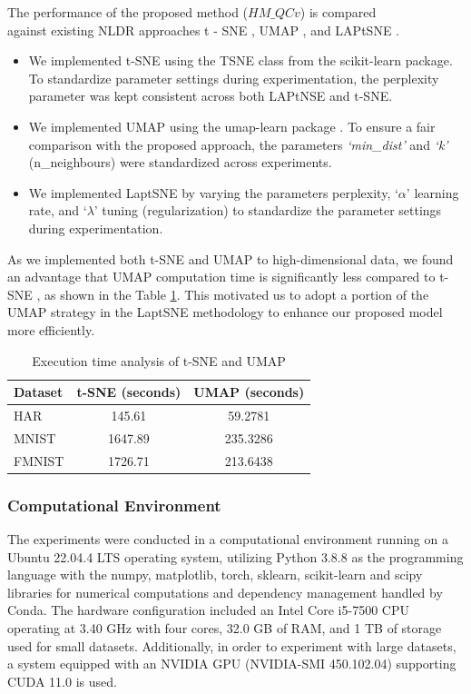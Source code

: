 The performance of the proposed method ($HM\_QCv$) is compared \\against existing NLDR approaches t - SNE \cite{tsne}, UMAP \cite{umap_reference}, and LAPtSNE \cite{sun2023laplacian}.

\begin{itemize}
    \item We implemented t-SNE \cite{tsne} using the TSNE class from the scikit-learn package. To standardize parameter settings during experimentation, the perplexity parameter was kept consistent across both LAPtNSE and t-SNE.
    \item We implemented UMAP \cite{umap_reference} using the umap-learn package \cite{umap-learn}. To ensure a fair comparison with the proposed approach, the parameters \textit{`min\_dist'} and \textit{`k'} (n\_neighbours) were standardized across experiments. 
    \item We implemented LaptSNE \cite{sun2023laplacian} by varying the parameters perplexity, `$\alpha$' learning rate, and `$\lambda$' tuning (regularization) to standardize the parameter settings during experimentation.
\end{itemize}
As we implemented both t-SNE \cite{tsne} and UMAP \cite{umap_reference} to high-dimensional data, we found an advantage that UMAP \cite{umap_reference} computation time is significantly less compared to t-SNE \cite{tsne}, as shown in the Table \ref{tsneumapcmp}. This motivated us to adopt a portion of the UMAP \cite{umap_reference} strategy in the LaptSNE \cite{sun2023laplacian} methodology to enhance our proposed model more efficiently.
\begin{table}[!htbp]
    \centering
    \caption{Execution time analysis of t-SNE and UMAP}
    \begin{tabular}{@{}lcc@{}}
        \toprule
        \textbf{Dataset} & \textbf{t-SNE \cite{tsne} (seconds)} & \textbf{UMAP \cite{umap_reference} (seconds)} \\ \midrule
        HAR    & 145.61    & 59.2781  \\
        MNIST  & 1647.89   & 235.3286 \\
        FMNIST & 1726.71   & 213.6438 \\ \bottomrule
    \end{tabular}
    \label{tsneumapcmp}
\end{table}


\subsubsection{Computational Environment}
The experiments were conducted in a computational environment running on a Ubuntu 22.04.4 LTS operating system, utilizing Python 3.8.8 as the programming language with the numpy, matplotlib, torch, sklearn, scikit-learn and scipy libraries for numerical computations and dependency management handled by Conda. The hardware configuration included an Intel Core i5-7500 CPU operating at 3.40 GHz with four cores, 32.0 GB of RAM, and 1 TB of storage used for small datasets. Additionally, in order to experiment with large datasets, a system equipped with an NVIDIA GPU (NVIDIA-SMI 450.102.04) supporting CUDA 11.0 is used.




